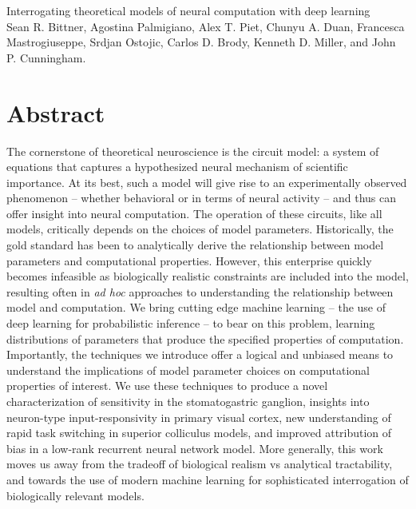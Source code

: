 \documentclass[11pt]{article}
\begin{document}
\medskip                        %

\thispagestyle{plain}
{\Large Interrogating theoretical models of neural computation with deep learning} \\
Sean R. Bittner, Agostina Palmigiano, Alex T. Piet, Chunyu A. Duan, Francesca Mastrogiuseppe, Srdjan Ostojic, Carlos D. Brody, Kenneth D. Miller, and John P. Cunningham.

\linenumbers
\section{Abstract}
The cornerstone of theoretical neuroscience is the circuit model: a system of equations that captures a hypothesized neural mechanism of scientific importance.  
At its best, such a model will give rise to an experimentally observed phenomenon -- whether behavioral or in terms of neural activity -- and thus can offer insight into neural computation.  
The operation of these circuits, like all models, critically depends on the choices of model parameters.  
Historically, the gold standard has been to analytically derive the relationship between model parameters and computational properties.  
However, this enterprise quickly becomes infeasible as biologically realistic constraints are included into the model, resulting often in \emph{ad hoc} approaches to understanding the relationship between model and computation.  
We bring cutting edge machine learning -- the use of deep learning for probabilistic inference -- to bear on this problem, learning distributions of parameters that produce the specified properties of computation.   
Importantly, the techniques we introduce offer a logical and unbiased means to understand the implications of model parameter choices on computational properties of interest.  
We use these techniques to produce a novel characterization of sensitivity in the stomatogastric ganglion, insights into neuron-type input-responsivity in primary visual cortex, new understanding of rapid task switching in superior colliculus models, and improved attribution of bias in a low-rank recurrent neural network model. 
More generally, this work moves us away from the tradeoff of biological realism vs analytical tractability, and towards the use of modern machine learning for sophisticated interrogation of biologically relevant models.
\end{document}

